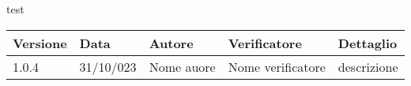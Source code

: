 \documentclass{article}
\begin{document}
    test
    \begin{tabular}{|C{2.5cm}|C{2.5cm}|C{2.5cm}|C{2.5cm}|C{2.5cm}|}
        \hline
        \textbf{Versione} & \textbf{Data} & \textbf{Autore} & \textbf{Verificatore} & \textbf{Dettaglio} \\
        \hline \hline
        \label{Git_Action_Version} 1.0.4 & 31/10/023 & Nome auore & Nome verificatore & descrizione \\
        \hline
    
    \end{tabular}
\end{document}
